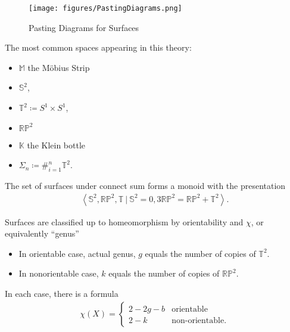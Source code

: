 \begin{figure}
\centering
\texttt{[image: figures/PastingDiagrams.png]}
\caption{Pasting Diagrams for Surfaces}
\end{figure}

The most common spaces appearing in this theory:

\begin{itemize}
\tightlist
\item
  \({\mathbb{M}}\) the Möbius Strip
\item
  \({\mathbb{S}}^2\),
\item
  \({\mathbb{T}}^2 \coloneqq S^1\times S^1\),
\item
  \({\mathbb{RP}}^2\)
\item
  \({\mathbb{K}}\) the Klein bottle
\item
  \(\Sigma_n \coloneqq\#_{i=1}^n {\mathbb{T}}^2\).
\end{itemize}

\begin{theorem}

The set of surfaces under connect sum forms a monoid with the
presentation
\begin{align*}  
\left\langle{ {\mathbb{S}}^2, {\mathbb{RP}}^2, {\mathbb{T}}{~\mathrel{\Big|}~}{\mathbb{S}}^2 = 0, 3{\mathbb{RP}}^2 = {\mathbb{RP}}^2 + {\mathbb{T}}^2}\right\rangle
.\end{align*}

Surfaces are classified up to homeomorphism by orientability and
\(\chi\), or equivalently ``genus''

\begin{itemize}
\tightlist
\item
  In orientable case, actual genus, \(g\) equals the number of copies of
  \({\mathbb{T}}^2\).
\item
  In nonorientable case, \(k\) equals the number of copies of
  \({\mathbb{RP}}^2\).
\end{itemize}

In each case, there is a formula
\begin{align*}  
\chi(X) = 
\begin{cases}
2-2g - b & \text{orientable} \\
2 - k & \text{non-orientable}.
\end{cases}
\end{align*}

\end{theorem}

